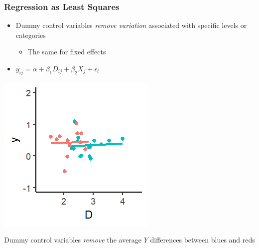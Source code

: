 \documentclass[xcolor=x11names,compress]{beamer}\usepackage[]{graphicx}\usepackage[]{color}
\makeatletter
\def\maxwidth{ %
  \ifdim\Gin@nat@width>\linewidth
    \linewidth
  \else
    \Gin@nat@width
  \fi
}
\newenvironment{knitrout}{}{} %
\renewcommand{\(}{\begin{columns}}
\renewcommand{\)}{\end{columns}}
\newcommand{\<}[1]{\begin{column}{#1}}
\renewcommand{\>}{\end{column}}
\makeatother
\begin{document}
\begin{frame}
\frametitle{Regression as Least Squares}
\begin{itemize}
\item Dummy control variables \textit{remove variation} associated with specific levels or categories
\begin{itemize}
\item The same for fixed effects
\end{itemize}
\item $y_{ij} = \alpha + \beta_1 D_{ij} + \beta_2 X_j + \epsilon_i$
\end{itemize}
\begin{multicols}{2}
\begin{knitrout}
\color{fgcolor}
\includegraphics[width=\maxwidth]{figure/graph_ols_FE4-1} 

\end{knitrout}
\columnbreak
Dummy control variables \textit{remove} the average $Y$ differences between blues and reds
\end{multicols}
\end{frame}
\end{document}

